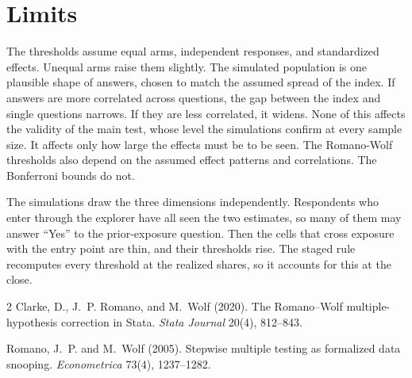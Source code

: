 \documentclass[11pt]{article}
\begin{document}
\section{Limits}

The thresholds assume equal arms, independent responses, and standardized effects. Unequal arms
raise them slightly. The simulated population is one plausible shape of answers, chosen to match
the assumed spread of the index. If answers are more correlated across questions, the gap between
the index and single questions narrows. If they are less correlated, it widens. None of this
affects the validity of the main test, whose level the simulations confirm at every sample size.
It affects only how large the effects must be to be seen. The Romano-Wolf thresholds also depend on
the assumed effect patterns and correlations. The Bonferroni bounds do not.

The simulations draw the three dimensions independently. Respondents who enter through the
explorer have all seen the two estimates, so many of them may answer ``Yes'' to the prior-exposure
question. Then the cells that cross exposure with the entry point are thin, and their thresholds
rise. The staged rule recomputes every threshold at the realized shares, so it accounts for this
at the close.

\begin{thebibliography}{2}
Clarke, D., J.~P. Romano, and M.~Wolf (2020). The Romano--Wolf multiple-hypothesis correction in
Stata. \emph{Stata Journal} 20(4), 812--843.

Romano, J.~P. and M.~Wolf (2005). Stepwise multiple testing as formalized data snooping.
\emph{Econometrica} 73(4), 1237--1282.
\end{thebibliography}
\end{document}
